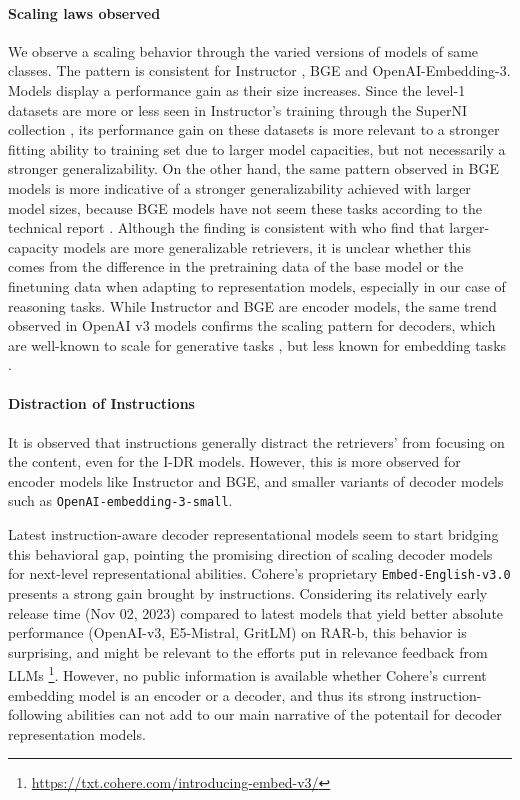 \documentclass{article} %
\begin{document}
\paragraph{Scaling laws observed} We observe a scaling behavior through the varied versions of models of same classes. The pattern is consistent for Instructor \citep{su2022one}, BGE \citep{xiao2023c} and OpenAI-Embedding-3. Models display a performance gain as their size increases. Since the level-1 datasets are more or less seen in Instructor's training through the SuperNI collection \citep{wang2022super}, its performance gain on these datasets is more relevant to a stronger fitting ability to training set due to larger model capacities, but not necessarily a stronger generalizability. On the other hand, the same pattern observed in BGE models \citep{xiao2023c} is more indicative of a stronger generalizability achieved with larger model sizes, because BGE models have not seem these tasks according to the technical report \citep{xiao2023c}. Although the finding is consistent with \citep{ni2022large} who find that larger-capacity models are more generalizable retrievers, it is unclear whether this comes from the difference in the pretraining data of the base model or the finetuning data when adapting to representation models, especially in our case of reasoning tasks. While Instructor and BGE are encoder models, the same trend observed in OpenAI v3 models confirms the scaling pattern for decoders, which are well-known to scale for generative tasks \citep{kaplan2020scaling,hoffmann2022training,wei2022emergent}, but less known for embedding tasks \citep{muennighoff2022sgpt}.






\paragraph{Distraction of Instructions} 
It is observed that instructions generally distract the retrievers' from focusing on the content, even for the I-DR models. However, this is more observed for encoder models like Instructor and BGE, and smaller variants of decoder models such as \texttt{OpenAI-embedding-3-small}. 

Latest instruction-aware decoder representational models \citep{wang2023improving,muennighoff2024generative} seem to start bridging this behavioral gap, pointing the promising direction of scaling decoder models for next-level representational abilities. Cohere's proprietary \texttt{Embed-English-v3.0} presents a strong gain brought by instructions. Considering its relatively early release time (Nov 02, 2023) compared to latest models that yield better absolute performance (OpenAI-v3, E5-Mistral, GritLM) on RAR-b, this behavior is surprising, and might be relevant to the efforts put in relevance feedback from LLMs \footnote{\url{https://txt.cohere.com/introducing-embed-v3/}}. However, no public information is available whether Cohere's current embedding model is an encoder or a decoder, and thus its strong instruction-following abilities can not add to our main narrative of the potentail for decoder representation models. 
\end{document}
